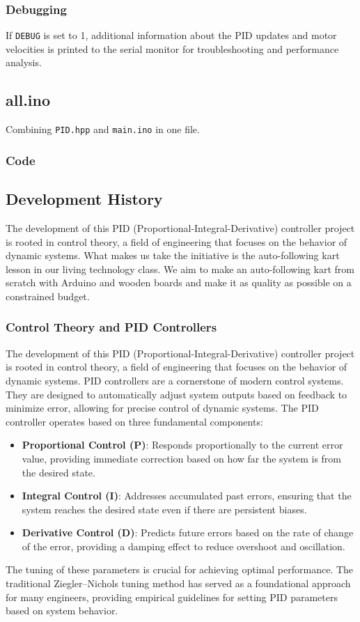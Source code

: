 \documentclass[a4paper,12pt]{article}
\begin{document}
\subsubsection{Debugging}
If \texttt{DEBUG} is set to 1, additional information about the PID updates and motor velocities is printed to the serial monitor for troubleshooting and performance analysis.
\subsection{all.ino}
Combining \texttt{PID.hpp} and \texttt{main.ino} in one file.
\subsubsection[language=C++]{Code}

\subsection{Development History}
The development of this PID (Proportional-Integral-Derivative) controller project is rooted in control theory, a field of engineering that focuses on the behavior of dynamic systems. What makes us take the initiative is the auto-following kart lesson in our living technology class. We aim to make an auto-following kart from scratch with Arduino and wooden boards and make it as quality as possible on a constrained budget.
\subsubsection{Control Theory and PID Controllers}
The development of this PID (Proportional-Integral-Derivative) controller project is rooted in control theory, a field of engineering that focuses on the behavior of dynamic systems. PID controllers are a cornerstone of modern control systems. They are designed to automatically adjust system outputs based on feedback to minimize error, allowing for precise control of dynamic systems. The PID controller operates based on three fundamental components:
\begin{itemize}
\item \textbf{Proportional Control (P)}: Responds proportionally to the current error value, providing immediate correction based on how far the system is from the desired state.
\item \textbf{Integral Control (I)}: Addresses accumulated past errors, ensuring that the system reaches the desired state even if there are persistent biases.
\item \textbf{Derivative Control (D)}: Predicts future errors based on the rate of change of the error, providing a damping effect to reduce overshoot and oscillation.
\end{itemize}
The tuning of these parameters is crucial for achieving optimal performance. The traditional Ziegler–Nichols tuning method has served as a foundational approach for many engineers, providing empirical guidelines for setting PID parameters based on system behavior.
\end{document}
